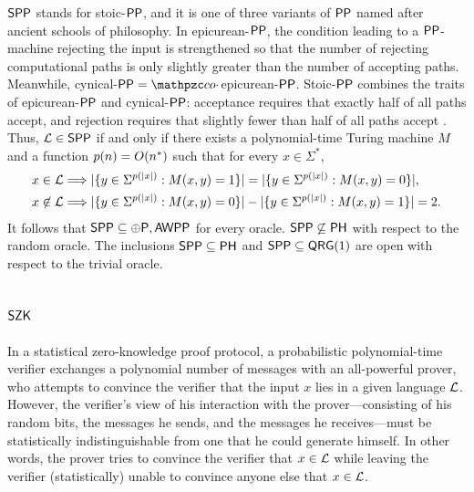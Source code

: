 $\mathsf{SPP}$ stands for stoic-$\mathsf{PP}$, and it is one of three variants of 
$\mathsf{PP}$ named after ancient schools of philosophy. In 
epicurean-$\mathsf{PP}$, the condition leading to a $\mathsf{PP}$-machine rejecting 
the input is strengthened so that the number of rejecting computational paths 
is only slightly greater than the number of accepting paths. Meanwhile, 
cynical-$\msf{PP}=\cco\cdot$epicurean-$\mathsf{PP}$. Stoic-$\mathsf{PP}$ combines the 
traits of epicurean-$\mathsf{PP}$ and cynical-$\mathsf{PP}$: acceptance requires that
exactly half of all paths accept, and rejection requires that slightly fewer 
than half of all paths accept \cite{fortnow2002}. Thus, $\mathcal{L}\in\mathsf{SPP}$ if 
and only if there exists a polynomial-time Turing machine $M$ and a function 
$p(n)=O(n^*)$ such that for every $x\in\Sigma^*$,
\begin{align*}
x\in\mathcal{L}&\Longrightarrow
|\{y\in\Sigma^{p(|x|)}:M(x,y)=1\}|=|\{y\in\Sigma^{p(|x|)}:M(x,y)=0\}|, \\
x\not\in\mathcal{L}&\Longrightarrow
|\{y\in\Sigma^{p(|x|)}:M(x,y)=0\}|-|\{y\in\Sigma^{p(|x|)}:M(x,y)=1\}|=2.
\end{align*}
It follows that $\mathsf{SPP}\subseteq\oplus\mathsf{P},\mathsf{AWPP}$ for every oracle. 
$\mathsf{SPP}\not\subseteq\mathsf{PH}$ with respect to the random oracle. The 
inclusions $\mathsf{SPP}\subseteq\mathsf{PH}$ and $\mathsf{SPP}\subseteq\mathsf{QRG}(1)$ 
are open with respect to the trivial oracle.

\subsection{$\mathsf{SZK}$} \label{szk-subsection}

In a statistical zero-knowledge proof protocol, a probabilistic polynomial-time
verifier exchanges a polynomial number of messages with an all-powerful prover,
who attempts to convince the verifier that the input $x$ lies in a given 
language $\mathcal{L}$. However, the verifier's view of his interaction with the 
prover---consisting of his random bits, the messages he sends, and the messages
he receives---must be statistically indistinguishable from one that he could 
generate himself. In other words, the prover tries to convince the verifier 
that $x\in\mathcal{L}$ while leaving the verifier (statistically) unable to convince 
anyone else that $x\in\mathcal{L}$.

